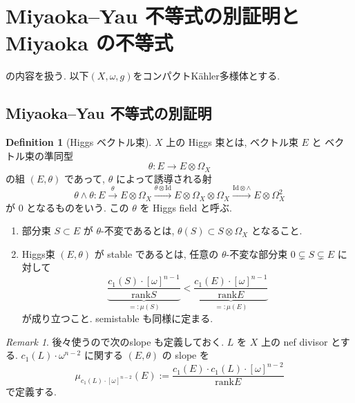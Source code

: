 \documentclass[dvipdfmx,a4paper,11pt]{article} %
\theoremstyle{definition}
\newtheorem{defn}[thm]{Definition}
\theoremstyle{remark}
\newtheorem{rem}[thm]{Remark}
\numberwithin{equation}{section}
\begin{document}
\newpage

\section{Miyaoka--Yau 不等式の別証明と Miyaoka の不等式}
\label{sec-Miyaoka}
\cite{Miy87, Cao13, Ou23, IM22, IMM24}の内容を扱う. 
以下$(X, \omega, g)$をコンパクトK\"ahler多様体とする. 

\subsection{Miyaoka--Yau 不等式の別証明}

\begin{defn}[Higgs ベクトル束]
\(X\) 上の Higgs 束とは, ベクトル束 \(E\) と 
ベクトル束の準同型
\[
\theta\colon E\longrightarrow E\otimes \Omega_X
\]
の組 \((E,\theta)\) であって, \(\theta\) によって誘導される射
\[
\theta\wedge\theta\colon 
E
\overset{\theta}{\longrightarrow }E\otimes \Omega_X
\overset{\theta \otimes \mathrm{Id}}{\longrightarrow }E\otimes \Omega_X \otimes \Omega_X
\overset{\mathrm{Id} \otimes \wedge}{\longrightarrow }
E\otimes \Omega_X^2
\]
が \(0\) となるものをいう. この \(\theta\) を Higgs field と呼ぶ.

\begin{enumerate}
\item 部分束 \(S\subset E\) が \(\theta\)-不変であるとは,
\(
\theta(S) \subset  
S\otimes \Omega_X
\)
となること. 
\item Higgs束 \((E,\theta)\) が stable であるとは, 任意の \(\theta\)-不変な部分束
\(
0\subsetneq S\subsetneq E
\)
に対して
\[
\underbrace{\frac{c_1(S)\cdot [\omega]^{n-1}}{\mathrm{rank}S}}_{=:\mu(S)}
<
\underbrace{\frac{c_1(E)\cdot [\omega]^{n-1}}{\mathrm{rank}E}}_{=:\mu(E)}
\]
が成り立つこと. 
semistable も同様に定まる. 
\end{enumerate}
\end{defn}
\begin{rem}
後々使うので次のslope も定義しておく. 
\(L\) を \(X\) 上の nef  divisor とする. \(c_1(L) \cdot  \omega^{n-2}\) に関する \((E,\theta)\) の slope を
\[
\mu_{c_1(L) \cdot  [\omega]^{n-2}}(E)
:=
\frac{c_1(E)\cdot c_1(L) \cdot [\omega]^{n-2}}{\mathrm{rank}E}
\]
で定義する.
\end{rem}
\end{document}
